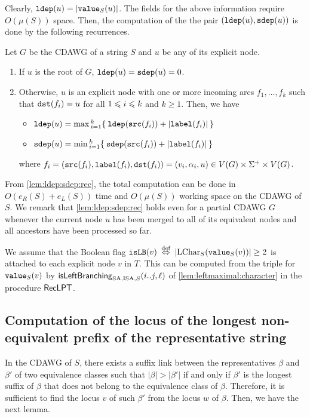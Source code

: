\documentclass{article}
\begin{document}
Clearly, $\ldep(u) = |\Value(u)|$.
The fields for the above information require $O(\mu(S))$ space. 
Then, the computation of the the pair $(\op{ldep}(u), \sdep(u))$ is done by the following recurrences. 
\begin{lemma}\label{lem:ldep:sdep:rec}
Let $G$ be the CDAWG  of a string $S$ and $u$ be any of its explicit node. 
\begin{enumerate}
\item If $u$ is the root of $G$, $\ldep(u) = \sdep(u) = 0$. 
  
\item Otherwise, $u$ is an explicit node with one or more incoming arcs $f_1, \dots, f_k$ such that $\dst(f_i) = u$ for all $\btw i1k$ and $k\ge 1$.
Then, we have 
  \begin{itemize}
  \item $\ldep(u) = \max{}\idx i1k \{\: \ldep(\src(f_i)) + |\lab(f_i)|  \:\}$
  \item $\sdep(u) = \min{}\idx i1k \{\: \sdep(\src(f_i)) + |\lab(f_i)|  \:\}$
  \end{itemize}
  where $f_i = (\src(f_i), \lab(f_i), \dst(f_i)) = (v_i, \alpha_i, u) \in V(G)\by\Sigma^+\by V(G)$. 
\end{enumerate}
\end{lemma}

From \cref{lem:ldep:sdep:rec}, the total computation can be done in $O(e_R(S)+e_L(S))$ time and $O(\mu(S))$ working space on the CDAWG of $S$. 
We remark that \cref{lem:ldep:sdep:rec} holds even for a partial CDAWG $G$ whenever the current node $u$ has been merged to all of its equivalent nodes and all ancestors have been processed so far.

  We assume that the Boolean flag $\op{isLB}(v) \iffdef |\LChar(\Value(v))|\ge 2$ is attached to each explicit node $v$ in $T$. This can be  computed from the triple for $\Value(v)$ by $\isLeftBranching(i..j, \ell)$ of \cref{lem:leftmaximal:character} in the procedure $\RecLPT$. 



\subsection{Computation of the locus of the longest non-equivalent prefix of the representative string}
\label{sec:compute:cdawg:equiv:classes}
In the CDAWG of $S$, there exists a suffix link between the representatives $\beta$ and $\beta'$ of two equivalence classes such that $|\beta| > |\beta'|$ if and only if $\beta'$ is the longest suffix of $\beta$ that does not belong to the equivalence class of $\beta$.
Therefore, it is sufficient to find the locus $v$ of such $\beta'$ from the locus $w$ of $\beta$. Then, we have the next lemma. 
\end{document}
